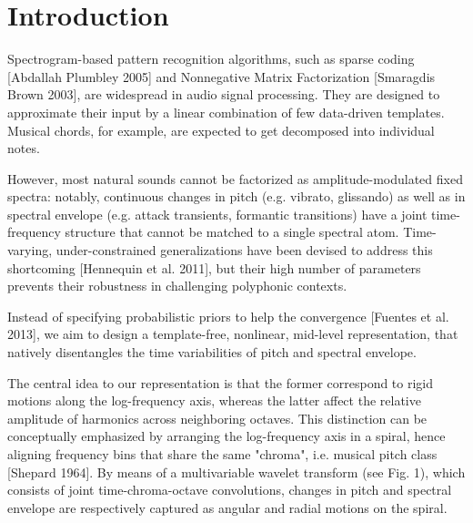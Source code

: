 \documentclass[twoside,a4paper]{article}
\title{\papertitle}
\affiliation{
\paperauthorA, \paperauthorB \sthanks{This work was supported by the XYZ Foundation}}
{\href{http://di.ens.fr/data/}{Dept. of Computer Science}, \\
\'{E}cole normale sup\'{e}rieure \\
Paris, France\\
{\tt \href{mailto:vincent.lostanlen@ens.fr}{vincent.lostanlen@ens.fr}}
}
\newif\ifpdf
\begin{document}
\ifpdf %
  \DeclareGraphicsExtensions{.png,.jpg,.pdf}
\else  %
\fi

\maketitle

\begin{abstract}
\end{abstract}

\section{Introduction}
Spectrogram-based pattern recognition algorithms, such as sparse coding [Abdallah Plumbley 2005] and Nonnegative Matrix Factorization [Smaragdis Brown 2003], are widespread in audio signal processing.
They are designed to approximate their input by a linear combination of few data-driven templates.
Musical chords, for example, are expected to get decomposed into individual notes.

However, most natural sounds cannot be factorized as amplitude-modulated fixed spectra: notably, continuous changes in pitch (e.g. vibrato, glissando) as well as in spectral envelope (e.g. attack transients, formantic transitions) have a joint time-frequency structure that cannot be matched to a single spectral atom.
Time-varying, under-constrained generalizations have been devised to address this shortcoming [Hennequin et al. 2011], but their high number of parameters prevents their robustness in challenging polyphonic contexts.

Instead of specifying probabilistic priors to help the convergence [Fuentes et al. 2013], we aim to design a template-free, nonlinear, mid-level representation, that natively disentangles the time variabilities of pitch and spectral envelope.

The central idea to our representation is that the former correspond to rigid motions along the log-frequency axis, whereas the latter affect the relative amplitude of harmonics across neighboring octaves.
This distinction can be conceptually emphasized by arranging the log-frequency axis in a spiral, hence aligning frequency bins that share the same "chroma", i.e. musical pitch class [Shepard 1964].
By means of a multivariable wavelet transform (see Fig. 1), which consists of joint time-chroma-octave convolutions, changes in pitch and spectral envelope are respectively captured as angular and radial motions on the spiral.
\end{document}
